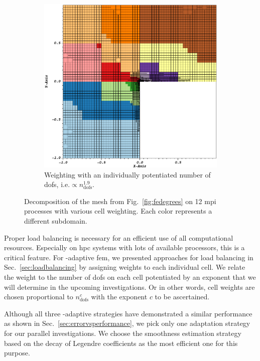 \begin{figure}
\begin{subfigure}[t]{.49\textwidth}
  \includegraphics[width=\textwidth]{figures/results/corner-2d-error-hp-legendre-05_subdomain12_customweighting.png}
  \caption{Weighting with an individually potentiated number of \glspl{dof}, i.e.\@ $\propto n_\text{dofs}^{1.9}$.}
\end{subfigure}
\caption{Decomposition of the mesh from Fig.~\ref{fig:fedegrees} on 12 \gls{mpi} processes with various cell weighting. Each color represents a different subdomain.}
\label{fig:decomposition}
\end{figure}

Proper load balancing is necessary for an efficient use of all computational resources. Especially on \gls{hpc} systems with lots of available processors, this is a critical feature. For \hp-adaptive \gls{fem}, we presented approaches for load balancing in Sec.~\ref{sec:loadbalancing} by assigning weights to each individual cell. We relate the weight to the number of \glspl{dof} on each cell potentiated by an exponent that we will determine in the upcoming investigations. Or in other words, cell weights are chosen proportional to $n_\text{dofs}^c$ with the exponent $c$ to be ascertained.

Although all three \hp-adaptive strategies have demonstrated a similar performance as shown in Sec.~\ref{sec:errorvsperformance}, we pick only one adaptation strategy for our parallel investigations. We choose the smoothness estimation strategy based on the decay of Legendre coefficients as the most efficient one for this purpose.

